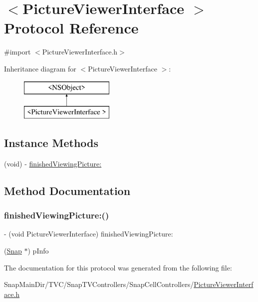 \hypertarget{protocol_picture_viewer_interface_01-p}{}\section{$<$Picture\+Viewer\+Interface $>$ Protocol Reference}
\label{protocol_picture_viewer_interface_01-p}


{\ttfamily \#import $<$Picture\+Viewer\+Interface.\+h$>$}

Inheritance diagram for $<$Picture\+Viewer\+Interface $>$\+:\begin{figure}[H]
\begin{center}
\leavevmode
\includegraphics[height=2.000000cm]{protocol_picture_viewer_interface_01-p}
\end{center}
\end{figure}
\subsection*{Instance Methods}
\begin{DoxyCompactItemize}
\item 
(void) -\/ \hyperlink{protocol_picture_viewer_interface_01-p_aa4c259bbd64debb71a50844920b63a96}{finished\+Viewing\+Picture\+:}
\end{DoxyCompactItemize}


\subsection{Method Documentation}
\hypertarget{protocol_picture_viewer_interface_01-p_aa4c259bbd64debb71a50844920b63a96}{}\label{protocol_picture_viewer_interface_01-p_aa4c259bbd64debb71a50844920b63a96} 
\subsubsection{\texorpdfstring{finished\+Viewing\+Picture\+:()}{finishedViewingPicture:()}}
{\footnotesize\ttfamily -\/ (void Picture\+Viewer\+Interface) finished\+Viewing\+Picture\+: \begin{DoxyParamCaption}\item[{(\hyperlink{interface_snap}{Snap} $\ast$)}]{p\+Info }\end{DoxyParamCaption}}



The documentation for this protocol was generated from the following file\+:\begin{DoxyCompactItemize}
\item 
Snap\+Main\+Dir/\+T\+V\+C/\+Snap\+T\+V\+Controllers/\+Snap\+Cell\+Controllers/\hyperlink{_picture_viewer_interface_8h}{Picture\+Viewer\+Interface.\+h}\end{DoxyCompactItemize}
